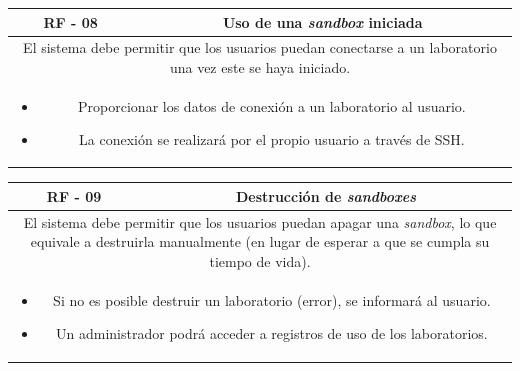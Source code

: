                \begin{table}[!htbp]
                    \centering
                    \begin{tabular}{|c|c|}
                        \hline
                        \textbf{RF - 08} & \textbf{Uso de una \textit{sandbox} iniciada} \\
                        \hline
                        \multicolumn{2}{|p{15cm}|}{
                            El sistema debe permitir que los usuarios puedan conectarse a un laboratorio una vez este se haya iniciado.
                        } \\
                        \hline
                        \multicolumn{2}{|p{15cm}|}{
                            \begin{itemize}
                                \item Proporcionar los datos de conexión a un laboratorio al usuario.
                                \item La conexión se realizará por el propio usuario a través de SSH.
                            \end{itemize}
                            } \\
                        \hline
                    \end{tabular}
                    \label{tab:RF8}
                \end{table}
                
                \begin{table}[!htbp]
                    \centering
                    \begin{tabular}{|c|c|}
                        \hline
                        \textbf{RF - 09} & \textbf{Destrucción de \textit{sandboxes}} \\
                        \hline
                        \multicolumn{2}{|p{15cm}|}{
                            El sistema debe permitir que los usuarios puedan apagar una \textit{sandbox}, lo que equivale a destruirla manualmente (en lugar de esperar a que se cumpla su tiempo de vida).
                        } \\
                        \hline
                        \multicolumn{2}{|p{15cm}|}{
                            \begin{itemize}
                                \item Si no es posible destruir un laboratorio (error), se informará al usuario.
                                \item Un administrador podrá acceder a registros de uso de los laboratorios.
                            \end{itemize}
                            } \\
                        \hline
                    \end{tabular}
                    \label{tab:RF09}
                \end{table}
                
